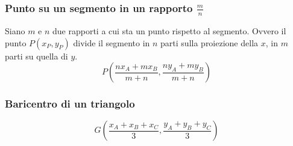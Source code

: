 \subsubsection{Punto su un segmento in un rapporto $\frac{m}{n}$}
Siano $m$ e $n$ due rapporti a cui sta un punto rispetto al segmento. Ovvero il punto $P(x_P, y_P)$
divide il segmento in $n$ parti sulla proiezione della $x$, in $m$ parti su quella di $y$.
\begin{equation*}
P\left(\frac{nx_A+mx_B}{m+n},\frac{ny_A+my_B}{m+n}\right)
\end{equation*}

\subsubsection{Baricentro di un triangolo}
\begin{equation*}
G\left(\frac{x_A+x_B+x_C}{3},\frac{y_A+y_B+y_C}{3}\right)
\end{equation*}

